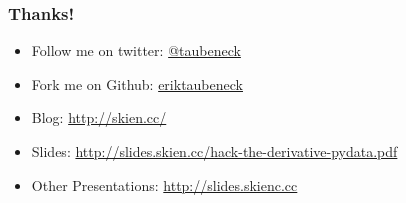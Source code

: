\documentclass{beamer}
\begin{document}
\begin{frame}

\frametitle{Thanks!}

\begin{itemize}
  \item Follow me on twitter: \href{https://twitter.com/taubeneck}{@taubeneck}
  \item Fork me on Github: \href{https://github.com/eriktaubeneck}{eriktaubeneck}
  \item Blog: \url{http://skien.cc/}
  \item Slides: \url{http://slides.skien.cc/hack-the-derivative-pydata.pdf}
  \item Other Presentations: \url{http://slides.skienc.cc}
\end{itemize}

\end{frame}
\end{document}
